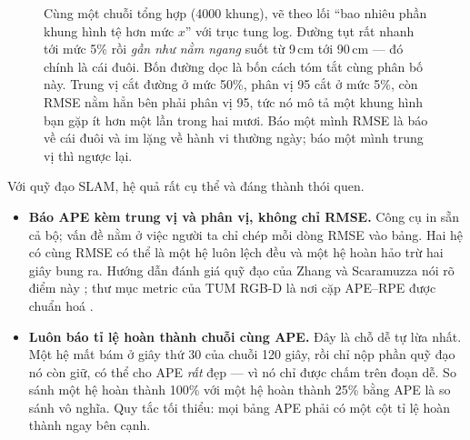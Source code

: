 \documentclass[../../deep_learning.tex]{subfiles}
\begin{document}
\begin{figure}[H]
{}
\caption{Cùng một chuỗi tổng hợp (4000 khung), vẽ theo lối ``bao nhiêu phần khung hình tệ hơn mức \(x\)'' với trục tung log. Đường tụt rất nhanh tới mức 5\% rồi \emph{gần như nằm ngang} suốt từ 9\,cm tới 90\,cm --- đó chính là cái đuôi. Bốn đường dọc là bốn cách tóm tắt cùng phân bố này. Trung vị cắt đường ở mức 50\%, phân vị 95 cắt ở mức 5\%, còn RMSE nằm hẳn bên phải phân vị 95, tức nó mô tả một khung hình bạn gặp ít hơn một lần trong hai mươi. Báo một mình RMSE là báo về cái đuôi và im lặng về hành vi thường ngày; báo một mình trung vị thì ngược lại.}
\label{fig:b07-duoi}
\end{figure}

Với quỹ đạo SLAM, hệ quả rất cụ thể và đáng thành thói quen.

\begin{itemize}
\item \textbf{Báo APE kèm trung vị và phân vị, không chỉ RMSE.} Công cụ  in sẵn cả bộ; vấn đề nằm ở việc người ta chỉ chép mỗi dòng RMSE vào bảng. Hai hệ có cùng RMSE có thể là một hệ luôn lệch đều và một hệ hoàn hảo trừ hai giây bung ra. Hướng dẫn đánh giá quỹ đạo của Zhang và Scaramuzza nói rõ điểm này \cite{zhang2018trajectory}; thư mục metric của TUM RGB-D là nơi cặp APE--RPE được chuẩn hoá \cite{sturm2012benchmark}.
\item \textbf{Luôn báo tỉ lệ hoàn thành chuỗi cùng APE.} Đây là chỗ dễ tự lừa nhất. Một hệ mất bám ở giây thứ 30 của chuỗi 120 giây, rồi chỉ nộp phần quỹ đạo nó còn giữ, có thể cho APE \emph{rất} đẹp --- vì nó chỉ được chấm trên đoạn dễ. So sánh một hệ hoàn thành 100\% với một hệ hoàn thành 25\% bằng APE là so sánh vô nghĩa. Quy tắc tối thiểu: mọi bảng APE phải có một cột tỉ lệ hoàn thành ngay bên cạnh.
\end{itemize}
\end{document}
